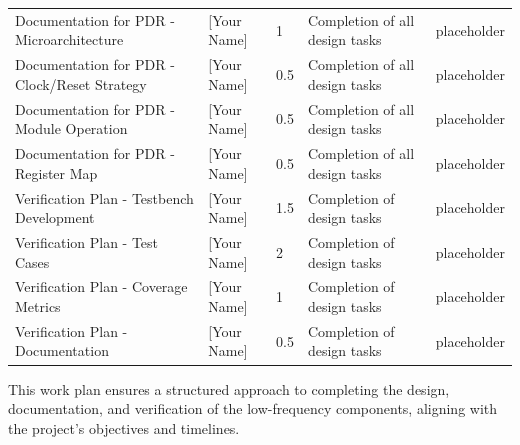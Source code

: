 \begin{longtable}{| m{} | m{} | m{} | m{} | m{} |}
    Documentation for PDR - Microarchitecture	                & [Your Name] &	1	& Completion of all design tasks	                        & placeholder \\
    Documentation for PDR - Clock/Reset Strategy	            & [Your Name] &	0.5	& Completion of all design tasks	                        & placeholder \\
    Documentation for PDR - Module Operation	                & [Your Name] &	0.5	& Completion of all design tasks	                        & placeholder \\
    Documentation for PDR - Register Map	                    & [Your Name] &	0.5	& Completion of all design tasks	                        & placeholder \\
    Verification Plan - Testbench Development	                & [Your Name] &	1.5	& Completion of design tasks	                            & placeholder \\
    Verification Plan - Test Cases	                            & [Your Name] &	2	& Completion of design tasks	                            & placeholder \\
    Verification Plan - Coverage Metrics	                    & [Your Name] &	1	& Completion of design tasks	                            & placeholder \\
    Verification Plan - Documentation	                        & [Your Name] &	0.5	& Completion of design tasks	                            & placeholder \\
\end{longtable}

This work plan ensures a structured approach to completing the design, documentation, and verification of the low-frequency components, aligning with the project's objectives and timelines.